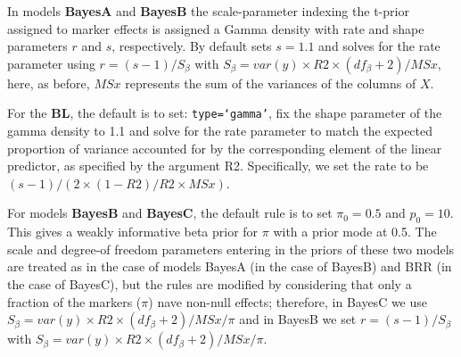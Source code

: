 \documentclass[article,shortnames,nojss]{jss}
\begin{document}
In models \textbf{BayesA} and \textbf{BayesB} the scale-parameter indexing the
t-prior assigned to marker effects is assigned a Gamma density with rate and
shape parameters $r$ and $s$, respectively. By default  sets $s= 1.1$ and solves
for the rate parameter using $r=(s-1)/S_\beta$ with 
$S_\beta=var(y)\times R2 \times (df_\beta+2)/MSx$, here, as before,
$MSx$ represents the sum of the variances of the columns of $X$.

For the \textbf{BL}, the default is to set: 
\texttt{type=`gamma'}, fix the shape parameter of 
the gamma density to 1.1 and solve for the rate 
parameter to match the expected proportion of 
variance accounted for by the corresponding element 
of the linear predictor, as specified by the 
argument R2. Specifically, we set the rate to be 
$(s-1)/(2 \times (1-R2)/R2 \times MSx)$.

For models \textbf{BayesB} and \textbf{BayesC}, the default rule is 
to set $\pi_0=0.5$ and $p_0=10$. This gives a 
weakly informative beta prior for $\pi$ with a prior mode 
at 0.5. The scale and degree-of freedom parameters entering 
in the priors of these two models are treated as in the case 
of models BayesA (in the case of BayesB) and BRR (in the case of BayesC), but the rules are modified 
by considering that only a fraction of the markers 
($\pi$) nave non-null effects; therefore, in BayesC we 
use $S_\beta=var(y)\times R2 \times(df_\beta+2)/MSx/\pi$ and in BayesB
we set $r=(s-1)/S_\beta$ with $S_\beta=var(y)\times R2 \times(df_\beta+2)/MSx/\pi$. 
\end{document}
